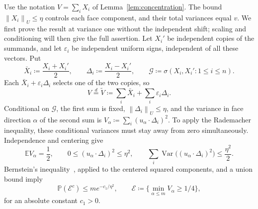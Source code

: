 \documentclass[11pt,letterpaper]{article}
\theoremstyle{remark}
\newcommand{\E}{\mathbb E}
\newcommand{\Pp}{\mathbb P}
\newcommand{\Var}{\operatorname{Var}}
\newcommand{\norm}[1]{\left\lVert#1\right\rVert}
\begin{document}
Use the notation \(V=\sum_iX_i\) of Lemma~\ref{lem:concentration}.
The bound \(\norm{X_i}_U\le\eta\) controls each face component,
and their total variances equal \(v\). We first prove the result
at variance one without the independent shift; scaling and conditioning
will then give the full assertion. Let \(X_i'\) be independent copies of the
summands, and let \(\varepsilon_i\) be independent uniform signs,
independent of all these vectors. Put
\[
 \bar X_i\coloneqq\frac{X_i+X_i'}2,\qquad
 \Delta_i\coloneqq\frac{X_i-X_i'}2,\qquad
 \mathcal G\coloneqq\sigma(X_i,X_i':1\le i\le n).
\]
Each \(\bar X_i+\varepsilon_i\Delta_i\) selects one of the two
copies, so
\begin{equation}
 V\stackrel d=\widetilde V\coloneqq
 \sum_i\bar X_i+\sum_i\varepsilon_i\Delta_i.
 \label{appx-eq:pair-representation}
\end{equation}
Conditional on \(\mathcal G\), the first sum is fixed,
\(\norm{\Delta_i}_U\le\eta\), and the variance in face direction
\(\alpha\) of the second sum is
\(V_\alpha\coloneqq\sum_i(u_\alpha\cdot\Delta_i)^2\).
To apply the Rademacher inequality, these conditional variances
must stay away from zero simultaneously. Independence and centering give
\[
 \E V_\alpha=\frac12,\qquad
 0\le(u_\alpha\cdot\Delta_i)^2\le\eta^2,\qquad
 \sum_i\Var\bigl((u_\alpha\cdot\Delta_i)^2\bigr)
 \le\frac{\eta^2}{2}.
\]
Bernstein's inequality~\cite[Chapter~2]{BLM2013}, applied to the
centered squared components, and a union bound imply
\begin{equation}
 \Pp(\mathcal E^c)\le m e^{-c_1/\eta^2},\qquad
 \mathcal E\coloneqq\{\min_{\alpha\le m}V_\alpha\ge1/4\},
 \label{appx-eq:conditional-variance}
\end{equation}
for an absolute constant \(c_1>0\).
\end{document}
